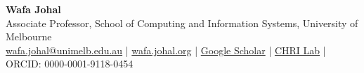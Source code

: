 \begin{center}
  {\large\textbf{Wafa Johal}}\\[2pt]
  Associate Professor, School of Computing and Information Systems,
  University of Melbourne\\[2pt]
  \href{mailto:wafa.johal@unimelb.edu.au}{wafa.johal@unimelb.edu.au}
  \;|\;
  \href{https://wafa.johal.org}{wafa.johal.org}
  \;|\;
  \href{https://scholar.google.fr/citations?user=GR9bAl0AAAAJ}{Google Scholar}
  \;|\;
  \href{https://chri-lab.github.io}{CHRI Lab}
  \;|\;
  ORCID: 0000-0001-9118-0454
\end{center}